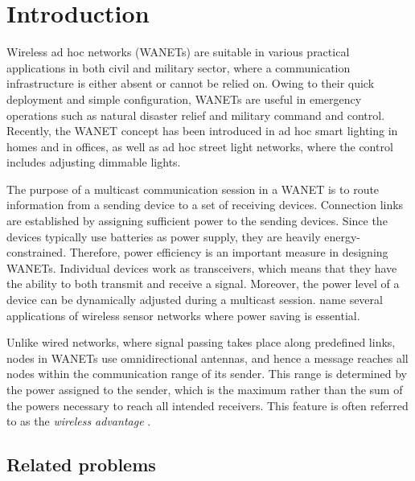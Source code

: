 \section{Introduction}
\label{intro}

Wireless ad hoc networks (WANETs) are suitable in various practical applications in both civil and military sector, 
where a communication infrastructure is either absent or cannot be relied on.
Owing to their quick deployment and simple configuration, WANETs are useful in emergency operations such as natural disaster relief and military command and control.
Recently, the WANET concept has been introduced in ad hoc smart lighting in homes and in offices, 
as well as ad hoc street light networks, where the control includes adjusting dimmable lights.
 
The purpose of a multicast communication session in a WANET is to route information from a sending device to a set of receiving devices.
Connection links are established by assigning sufficient power to the sending devices.
Since the devices typically use batteries as power supply, they are heavily energy-constrained.
Therefore, power efficiency is an important measure in designing WANETs.
Individual devices work as transceivers, which means that they have the ability to both transmit and receive a signal.
Moreover, the power level of a device can be dynamically adjusted during a multicast session.
\citet{montemanni11} name several applications of wireless sensor networks where power saving is essential.

Unlike wired networks, where signal passing takes place along predefined links, nodes in WANETs use omnidirectional antennas, 
and hence a message reaches all nodes within the communication range of its sender.
This range is determined by the power assigned to the sender, which is the maximum rather than the sum of the powers necessary to reach all intended receivers.
This feature is often referred to as the \emph{wireless advantage} \citep{Wieseltier00onthe}.

\subsection{Related problems}

